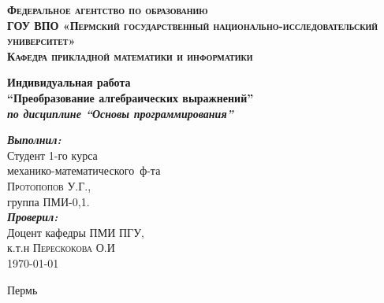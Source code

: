 \begin{titlepage}
\begin{center}


\textsc{\large \bf Федеральное агентство по образованию\\
ГОУ ВПО «Пермский государственный национально-исследовательский университет»\\
Кафедра прикладной математики и информатики}\\[1.5cm]

\vfill

{ \Large \bfseries Индивидуальная работа \\
``Преобразование алгебраических выражнений''\\
\em по дисциплине ``Основы программирования'' \\[0.4cm] }

\begin{flushright}
\begin{minipage}{0.5 \textwidth}
\begin{flushleft} \large
\emph{\bf Выполнил:} \\
Студент 1-го курса \\
механико-математического~ф-та \\
\textsc{Протопопов У.Г.},\\
группа ПМИ-0,1.\\
\emph{\bf Проверил:} \\
Доцент кафедры ПМИ ПГУ,\\
к.т.н {\underline{\hspace{50 pt}}} \textsc{Перескокова О.И}\\
\today
\end{flushleft}
\end{minipage}
\end{flushright}

\vfill

Пермь \the\year

\end{center}
\end{titlepage}

